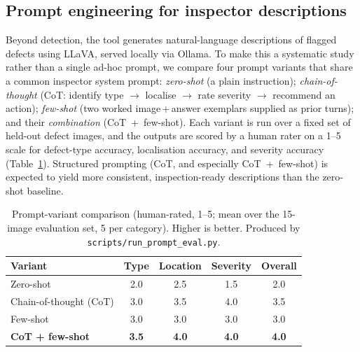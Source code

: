 \documentclass[11pt]{article}
\begin{document}
\subsection{Prompt engineering for inspector descriptions}
Beyond detection, the tool generates natural-language descriptions of flagged
defects using LLaVA, served locally via Ollama. To make this a systematic study
rather than a single ad-hoc prompt, we compare four prompt variants that share a
common inspector system prompt: \emph{zero-shot} (a plain instruction);
\emph{chain-of-thought} (CoT: identify type $\rightarrow$ localise
$\rightarrow$ rate severity $\rightarrow$ recommend an action); \emph{few-shot}
(two worked image\,+\,answer exemplars supplied as prior turns); and their
\emph{combination} (CoT~+~few-shot). Each variant is run over a fixed set of
held-out defect images, and the outputs are scored by a human rater on a 1--5
scale for defect-type accuracy, localisation accuracy, and severity accuracy
(Table~\ref{tab:prompts}). Structured prompting (CoT, and especially CoT~+~few-shot)
is expected to yield more consistent, inspection-ready descriptions than the
zero-shot baseline.

\begin{table}[h]
\centering
\caption{Prompt-variant comparison (human-rated, 1--5; mean over the 15-image
evaluation set, 5 per category). Higher is better. Produced by
\texttt{scripts/run\_prompt\_eval.py}.}
\label{tab:prompts}
\begin{tabular}{lcccc}
\toprule
Variant & Type & Location & Severity & Overall \\
\midrule
Zero-shot              & 2.0 & 2.5 & 1.5 & 2.0 \\
Chain-of-thought (CoT) & 3.0 & 3.5 & 4.0 & 3.5 \\
Few-shot               & 3.0 & 3.0 & 3.0 & 3.0 \\
\textbf{CoT + few-shot}& \textbf{3.5} & \textbf{4.0} & \textbf{4.0} & \textbf{4.0} \\
\bottomrule
\end{tabular}
\end{table}
\end{document}
